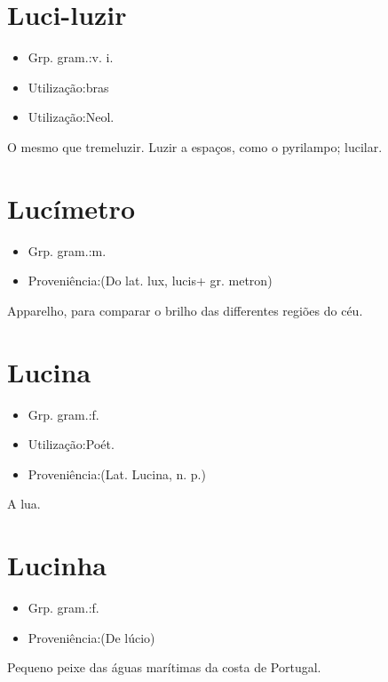 \section{Luci-luzir}
\begin{itemize}
\item {Grp. gram.:v. i.}
\end{itemize}
\begin{itemize}
\item {Utilização:bras}
\end{itemize}
\begin{itemize}
\item {Utilização:Neol.}
\end{itemize}
O mesmo que \textunderscore tremeluzir\textunderscore .
Luzir a espaços, como o pyrilampo; lucilar.
\section{Lucímetro}
\begin{itemize}
\item {Grp. gram.:m.}
\end{itemize}
\begin{itemize}
\item {Proveniência:(Do lat. \textunderscore lux\textunderscore , \textunderscore lucis\textunderscore  + gr. \textunderscore metron\textunderscore )}
\end{itemize}
Apparelho, para comparar o brilho das differentes regiões do céu.
\section{Lucina}
\begin{itemize}
\item {Grp. gram.:f.}
\end{itemize}
\begin{itemize}
\item {Utilização:Poét.}
\end{itemize}
\begin{itemize}
\item {Proveniência:(Lat. \textunderscore Lucina\textunderscore , n. p.)}
\end{itemize}
A lua.
\section{Lucinha}
\begin{itemize}
\item {Grp. gram.:f.}
\end{itemize}
\begin{itemize}
\item {Proveniência:(De \textunderscore lúcio\textunderscore )}
\end{itemize}
Pequeno peixe das águas marítimas da costa de Portugal.

